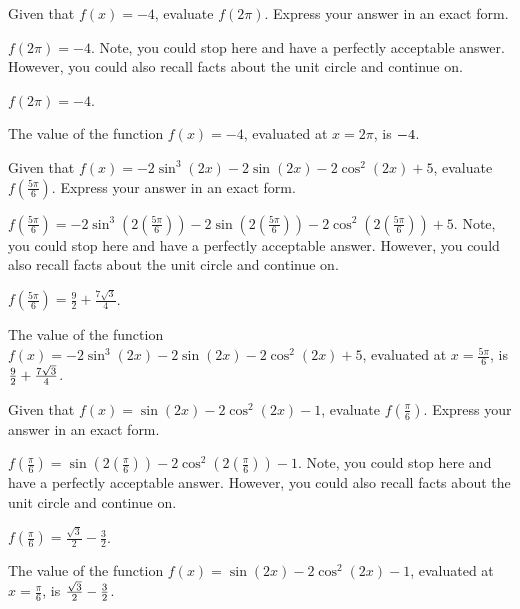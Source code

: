 \begin{shuffle}
\begin{exercise}
Given that $f(x)=-4$, evaluate $f\left(2 \pi\right)$. Express your answer in an exact form.
\begin{solution}
\begin{hint}
$f\left(2 \pi\right)=-4$. Note, you could stop here and have a perfectly acceptable answer. However, you could also recall facts about the unit circle and continue on. 
\end{hint}
\begin{hint}
$f\left(2 \pi\right)=-4$.
\end{hint}
The value of the function $f(x) = -4$, evaluated at $x=2 \pi$, is ${-4}$.
\end{solution}
\end{exercise}

\begin{exercise}
Given that $f(x)=-2 \sin ^3(2 x)-2 \sin (2 x)-2 \cos ^2(2 x)+5$, evaluate $f\left(\frac{5 \pi }{6}\right)$. Express your answer in an exact form.
\begin{solution}
\begin{hint}
$f\left(\frac{5 \pi }{6}\right)=-2 \sin ^3(2 \left(\frac{5 \pi }{6}\right))-2 \sin (2 \left(\frac{5 \pi }{6}\right))-2 \cos ^2(2 \left(\frac{5 \pi }{6}\right))+5$. Note, you could stop here and have a perfectly acceptable answer. However, you could also recall facts about the unit circle and continue on. 
\end{hint}
\begin{hint}
$f\left(\frac{5 \pi }{6}\right)=\frac{9}{2}+\frac{7 \sqrt{3}}{4}$.
\end{hint}
The value of the function $f(x) = -2 \sin ^3(2 x)-2 \sin (2 x)-2 \cos ^2(2 x)+5$, evaluated at $x=\frac{5 \pi }{6}$, is ${\frac{9}{2}+\frac{7 \sqrt{3}}{4}}$.
\end{solution}
\end{exercise}

\begin{exercise}
Given that $f(x)=\sin (2 x)-2 \cos ^2(2 x)-1$, evaluate $f\left(\frac{\pi }{6}\right)$. Express your answer in an exact form.
\begin{solution}
\begin{hint}
$f\left(\frac{\pi }{6}\right)=\sin (2 \left(\frac{\pi }{6}\right))-2 \cos ^2(2 \left(\frac{\pi }{6}\right))-1$. Note, you could stop here and have a perfectly acceptable answer. However, you could also recall facts about the unit circle and continue on. 
\end{hint}
\begin{hint}
$f\left(\frac{\pi }{6}\right)=\frac{\sqrt{3}}{2}-\frac{3}{2}$.
\end{hint}
The value of the function $f(x) = \sin (2 x)-2 \cos ^2(2 x)-1$, evaluated at $x=\frac{\pi }{6}$, is ${\frac{\sqrt{3}}{2}-\frac{3}{2}}$.
\end{solution}
\end{exercise}


\end{shuffle}
